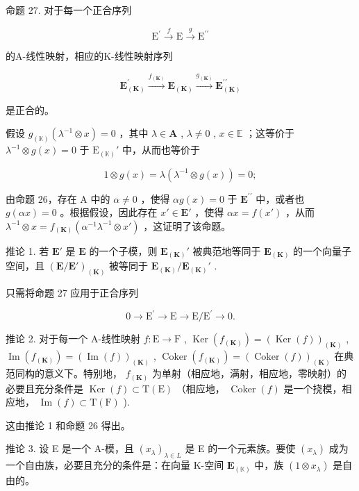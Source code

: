 命题 27. 对于每一个正合序列

\[
\mathrm{E} ^ {\prime} \xrightarrow {f} \mathrm{E} \xrightarrow {g} \mathrm{E} ^ {\prime \prime}
\]

的A-线性映射，相应的K-线性映射序列

\[
\mathbf {E} _ {(\mathbf {K})} ^ {\prime} \xrightarrow {f _ {(\mathbf {K})}} \mathbf {E} _ {(\mathbf {K})} \xrightarrow {g _ {(\mathbf {K})}} \mathbf {E} _ {(\mathbf {K})} ^ {\prime \prime}
\]

是正合的。

假设 \(g_{(\mathbb{K})}(\lambda^{-1} \otimes x) = 0\) ，其中 \(\lambda \in \mathbf{A}\) , \(\lambda \neq 0\) , \(x \in \mathbb{E}\) ；这等价于 \(\lambda^{-1} \otimes g(x) = 0\) 于 \(\mathrm{E}_{(\mathbb{K})}'\) 中，从而也等价于

\[
1 \otimes g (x) = \lambda (\lambda^ {- 1} \otimes g (x)) = 0;
\]

由命题 26，存在 A 中的 \(\alpha \neq 0\) ，使得 \(\alpha g(x) = 0\) 于 \(\mathbf{E}^{\prime \prime}\) 中，或者也 \(g(\alpha x) = 0\) 。根据假设，因此存在 \(x' \in \mathbf{E}'\) ，使得 \(\alpha x = f(x')\) ，从而 \(\lambda^{-1} \otimes x = f_{(\mathbf{K})}(\alpha^{-1}\lambda^{-1} \otimes x')\) ，这证明了该命题。

推论 1. 若 \(\mathbf{E}'\) 是 \(\mathbf{E}\) 的一个子模，则 \(\mathbf{E}_{(\mathbf{K})}'\) 被典范地等同于 \(\mathbf{E}_{(\mathbf{K})}\) 的一个向量子空间，且 \((\mathbf{E} / \mathbf{E}')_{(\mathbf{K})}\) 被等同于 \(\mathbf{E}_{(\mathbf{K})} / \mathbf{E}_{(\mathbf{K})}'\) .

只需将命题 27 应用于正合序列

\[
0 \rightarrow \mathrm{E} ^ {\prime} \rightarrow \mathrm{E} \rightarrow \mathrm{E} / \mathrm{E} ^ {\prime} \rightarrow 0.
\]

推论 2. 对于每一个 A-线性映射 \(f: \mathrm{E} \to \mathrm{F}\) , \(\operatorname{Ker}(f_{(\mathbf{K})}) = (\operatorname{Ker}(f))_{(\mathbf{K})}\) , \(\operatorname{Im}(f_{(\mathbf{K})}) = (\operatorname{Im}(f))_{(\mathbf{K})}\) , \(\operatorname{Coker}(f_{(\mathbf{K})}) = (\operatorname{Coker}(f))_{(\mathbf{K})}\) 在典范同构的意义下。特别地， \(f_{(\mathbf{K})}\) 为单射（相应地，满射，相应地，零映射）的必要且充分条件是 \(\operatorname{Ker}(f) \subset \mathrm{T}(\mathrm{E})\) （相应地， \(\operatorname{Coker}(f)\) 是一个挠模，相应地， \(\operatorname{Im}(f) \subset \mathrm{T}(\mathrm{F})\) ).

这由推论 1 和命题 26 得出。

推论 3. 设 E 是一个 A-模，且 \((x_{\lambda})_{\lambda \in L}\) 是 E 的一个元素族。要使 \((x_{\lambda})\) 成为一个自由族，必要且充分的条件是：在向量 K-空间 \(\mathbf{E}_{(\mathbb{K})}\) 中，族 \((1 \otimes x_{\lambda})\) 是自由的。

